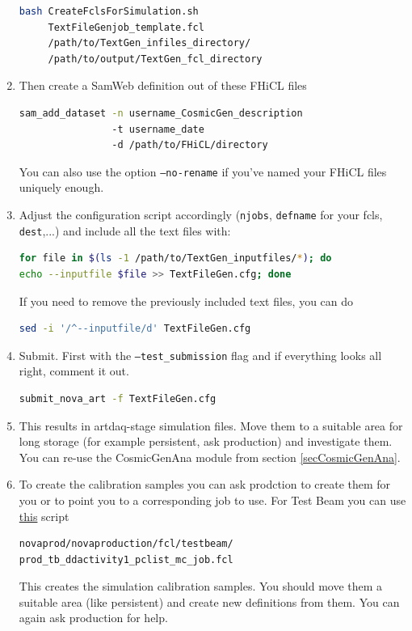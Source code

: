 \documentclass[12pt]{article}
\begin{document}
\begin{enumerate}
\begin{lstlisting}[frame=single,language=bash]
bash CreateFclsForSimulation.sh
     TextFileGenjob_template.fcl
     /path/to/TextGen_infiles_directory/
     /path/to/output/TextGen_fcl_directory
\end{lstlisting}

\item Then create a SamWeb definition out of these FHiCL files
\begin{lstlisting}[frame=single,language=bash]
sam_add_dataset -n username_CosmicGen_description
                -t username_date
                -d /path/to/FHiCL/directory
\end{lstlisting}
You can also use the option \texttt{--no-rename} if you've named your FHiCL files uniquely enough.

\item Adjust the configuration script accordingly (\texttt{njobs}, \texttt{defname} for your fcls, \texttt{dest},...) and include all the text files with:
\begin{lstlisting}[frame=single,language=bash]
for file in $(ls -1 /path/to/TextGen_inputfiles/*); do
echo --inputfile $file >> TextFileGen.cfg; done
\end{lstlisting}
If you need to remove the previously included text files, you can do
\begin{lstlisting}[frame=single,language=bash]
sed -i '/^--inputfile/d' TextFileGen.cfg
\end{lstlisting}

\item Submit. First with the \texttt{--test\_submission} flag and if everything looks all right, comment it out.
\begin{lstlisting}[frame=single,language=bash]
submit_nova_art -f TextFileGen.cfg
\end{lstlisting}

\item This results in artdaq-stage simulation files. Move them to a suitable area for long storage (for example persistent, ask production) and investigate them. You can re-use the CosmicGenAna module from section \ref{secCosmicGenAna}.

\item To create the calibration samples you can ask prodction to create them for you or to point you to a corresponding job to use. For Test Beam you can use \href{https://github.com/novaexperiment/novaprod/blob/main/novaproduction/fcl/testbeam/prod\_tb\_ddactivity1\_pclist\_mc\_job.fcl}{this} script
\begin{lstlisting}[frame=single,language=bash]
novaprod/novaproduction/fcl/testbeam/
prod_tb_ddactivity1_pclist_mc_job.fcl
\end{lstlisting}
This creates the simulation calibration samples. You should move them a suitable area (like persistent) and create new definitions from them. You can again ask production for help.
\end{enumerate}
\end{document}
